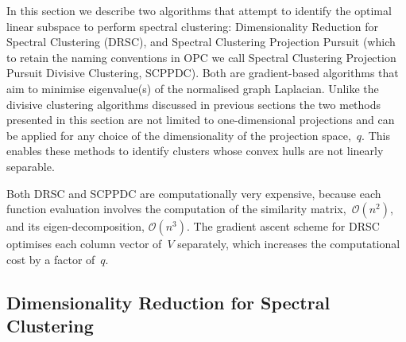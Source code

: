 \documentclass{book}
\begin{document}
In this section we describe two algorithms that attempt to identify the optimal
linear subspace to perform spectral clustering: Dimensionality Reduction for
Spectral Clustering (DRSC), and Spectral Clustering Projection Pursuit (which
to retain the naming conventions in OPC we call Spectral Clustering Projection
Pursuit Divisive Clustering, SCPPDC).
%
Both are gradient-based algorithms that aim to minimise eigenvalue(s) of the
normalised graph Laplacian.
%
Unlike the divisive clustering algorithms discussed in previous sections
the two methods presented in this section are not limited to
one-dimensional projections and can be applied for any choice of the
dimensionality of the projection space,~$q$.
%
This enables these methods to identify clusters whose convex hulls
are not linearly separable.





Both DRSC and SCPPDC are computationally very expensive, because each function evaluation involves
the computation of the similarity matrix,~$\mathcal{O}(n^2)$, and its eigen-decomposition,
$\mathcal{O}(n^3)$.
%
The gradient ascent scheme for DRSC optimises each column vector
of~$V$ separately, which increases the computational cost by a factor of~$q$.
%
%


\subsection{Dimensionality Reduction for Spectral Clustering}
\end{document}
